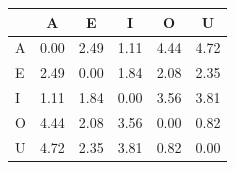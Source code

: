 \begin{tabular}{lccccc}
\toprule
\rowcolor{col01}
 & A & E & I & O & U \\
\midrule
A & 0.00 & 2.49 & 1.11 & 4.44 & 4.72 \\
E & 2.49 & 0.00 & 1.84 & 2.08 & 2.35 \\
I & 1.11 & 1.84 & 0.00 & 3.56 & 3.81 \\
O & 4.44 & 2.08 & 3.56 & 0.00 & 0.82 \\
U & 4.72 & 2.35 & 3.81 & 0.82 & 0.00 \\
\bottomrule
\end{tabular}
